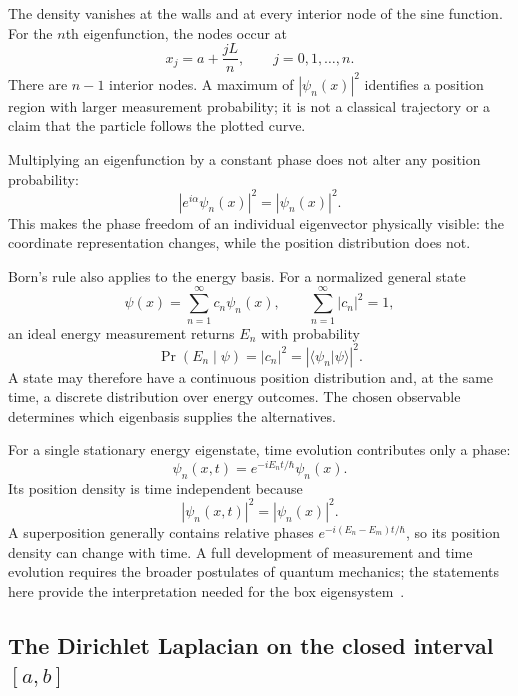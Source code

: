 The density vanishes at the walls and at every interior node of the sine
function. For the \(n\)th eigenfunction, the nodes occur at
\begin{equation}
  x_j=a+\frac{jL}{n},
  \qquad
  j=0,1,\ldots,n.
\end{equation}
There are \(n-1\) interior nodes. A maximum of \(|\psi_n(x)|^2\) identifies a
position region with larger measurement probability; it is not a classical
trajectory or a claim that the particle follows the plotted curve.

Multiplying an eigenfunction by a constant phase does not alter any position
probability:
\begin{equation}
  \left|e^{i\alpha}\psi_n(x)\right|^2
  =|\psi_n(x)|^2.
\end{equation}
This makes the phase freedom of an individual eigenvector physically visible:
the coordinate representation changes, while the position distribution does
not.

Born's rule also applies to the energy basis. For a normalized general state
\begin{equation}
  \psi(x)=\sum_{n=1}^{\infty}c_n\psi_n(x),
  \qquad
  \sum_{n=1}^{\infty}|c_n|^2=1,
\end{equation}
an ideal energy measurement returns \(E_n\) with probability
\begin{equation}
  \Pr(E_n\mid\psi)
  =|c_n|^2
  =\left|\langle\psi_n\vert\psi\rangle\right|^2.
\end{equation}
A state may therefore have a continuous position distribution and, at the same
time, a discrete distribution over energy outcomes. The chosen observable
determines which eigenbasis supplies the alternatives.

For a single stationary energy eigenstate, time evolution contributes only a
phase:
\begin{equation}
  \psi_n(x,t)
  =e^{-iE_nt/\hbar}\psi_n(x).
\end{equation}
Its position density is time independent because
\begin{equation}
  |\psi_n(x,t)|^2=|\psi_n(x)|^2.
\end{equation}
A superposition generally contains relative phases
\(e^{-i(E_n-E_m)t/\hbar}\), so its position density can change with time. A
full development of measurement and time evolution requires the broader
postulates of quantum mechanics; the statements here provide the interpretation
needed for the box eigensystem~\cite{shankar1994}.

\subsection{The Dirichlet Laplacian on the closed interval \([a,b]\)}


